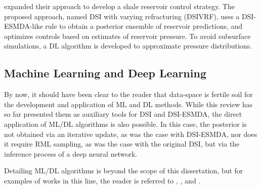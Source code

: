      expanded their approach to develop a shale reservoir control strategy.
    The proposed approach, named DSI with varying refracturing (DSIVRF),
    uses a DSI-ESMDA-like rule to obtain a posterior ensemble of reservoir predictions,
    and optimizes controls based on estimates of reservoir pressure. 
    To avoid subsurface simulations, a DL algorithm is developed to approximate pressure distributions.  
    
\subsection{Machine Learning and Deep Learning}
    By now, it should have been clear to the reader that data-space is fertile soil for the development and application
    of ML and DL methods.
    While this review has so far presented them as auxiliary tools for DSI and DSI-ESMDA, 
    the direct application of ML/DL algorithms is also possible.
    In this case, the posterior is not obtained via an iterative update, as was the case with DSI-ESMDA,
    nor does it require RML sampling, as was the case with the original DSI,
    but via the inference process of a deep neural network.
    
    Detailing ML/DL algorithms is beyond the scope of this dissertation,
    but for examples of works in this line, the reader is referred to
    ,
    , and
    .

